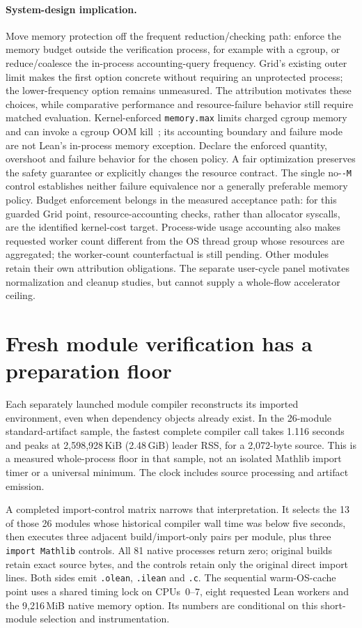 \documentclass[10pt,twocolumn]{article}
\begin{document}
\paragraph{System-design implication.}
Move memory protection off the frequent reduction/checking path:
enforce the memory budget outside the verification process, for example
with a cgroup, or reduce/coalesce the in-process accounting-query frequency.
Grid's existing outer limit makes the first option concrete without
requiring an unprotected process; the lower-frequency option remains
unmeasured.
The attribution motivates these choices, while comparative performance and
resource-failure behavior still require matched evaluation.
Kernel-enforced \texttt{memory.max} limits charged cgroup memory and can
invoke a cgroup OOM kill~\cite{cgroupV2Memory2026}; its accounting boundary
and failure mode are not Lean's in-process memory exception.
Declare the enforced quantity, overshoot and failure behavior for the chosen
policy. A fair optimization preserves the safety guarantee or explicitly
changes the resource contract.
The single no-\texttt{-M} control establishes neither failure equivalence
nor a generally preferable memory policy.
Budget enforcement belongs in the measured acceptance path: for this
guarded Grid point, resource-accounting checks, rather than allocator
syscalls, are the identified kernel-cost target.
Process-wide usage accounting also makes requested worker count different
from the OS thread group whose resources are aggregated; the worker-count
counterfactual is still pending.
Other modules retain their own attribution obligations.
The separate user-cycle panel motivates normalization and cleanup studies,
but cannot supply a whole-flow accelerator ceiling.


\section{Fresh module verification has a preparation floor}
\label{sec:imports}
Each separately launched module compiler reconstructs its imported
environment, even when dependency objects already exist.
In the 26-module standard-artifact sample, the fastest complete compiler
call takes 1.116 seconds and peaks at 2,598,928\,KiB
(2.48\,GiB) leader RSS, for a 2,072-byte source.
This is a measured whole-process floor in that sample, not an isolated
Mathlib import timer or a universal minimum.
The clock includes source processing and artifact emission.

A completed import-control matrix narrows that interpretation.
It selects the 13 of those 26 modules whose historical compiler wall time
was below five seconds, then executes three adjacent build/import-only
pairs per module, plus three \texttt{import Mathlib} controls.
All 81 native processes return zero; original builds retain exact source
bytes, and the controls retain only the original direct import lines.
Both sides emit \texttt{.olean}, \texttt{.ilean} and \texttt{.c}.
The sequential warm-OS-cache point uses a shared timing lock on CPUs~0--7,
eight requested Lean workers and the 9,216\,MiB native memory option.
Its numbers are conditional on this short-module selection and instrumentation.
\end{document}
